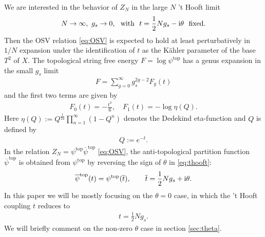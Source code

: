 \documentclass[11pt]{article}
\newcommand{\ri}{{\rm i}}
\def\th{\theta}
\newcommand{\hf}{\frac{1}{2}}
\def\b#1{\overline{#1}}
\renewcommand{\[}{\begin{eqnarray}}
\renewcommand{\]}{\end{eqnarray}}
\begin{document}
We are interested in the 
behavior of $Z_N$ in 
the large $N$ 't Hooft limit
\begin{align}
 N\to\infty,~g_s\to 0,~~ \text{with}~~ t=\hf Ng_s-\ri\th~~\text{fixed}.
\label{eq:thooft}
\end{align}
Then the OSV relation \eqref{eq:OSV}
is expected to hold  at least perturbatively in $1/N$ expansion 
under the identification of $t$ as the K\"{a}hler parameter of the base $T^2$
of $X$. The topological string
free energy $F=\log\psi^{\text{top}}$ has a genus expansion
in the small $g_s$ limit
\begin{align}
 F=\sum_{g=0}^\infty g_s^{2g-2}F_g(t)
\label{eq:free-g}
\end{align}
and the first two terms are given by
\begin{align}
 F_0(t)=-\frac{t^3}{6},\quad F_1(t)=-\log\eta(Q).
\label{eq:free-01}
\end{align}
Here $\eta(Q):=Q^{\frac{1}{24}}\prod_{n=1}^\infty (1-Q^n)$ denotes the Dedekind eta-function
and $Q$ is defined by
\begin{align}
 Q:=e^{-t}.
\end{align}
In the relation  $Z_N=\psi^{\text{top}}\b{\psi}^{\text{top}}$ \eqref{eq:OSV},
the anti-topological partition function $\b{\psi}^{\text{top}}$ is obtained from 
$\psi^{\text{top}}$ by reversing the sign of $\th$ in
\eqref{eq:thooft}: 
\begin{align}
 \b{\psi}^{\text{top}}(t)=\psi^{\text{top}}(\b{t}),\qquad
\b{t}=\hf Ng_s+\ri\th.
\end{align}
In this paper we will be mostly focusing on the $\th=0$ case,
in which the 't Hooft coupling $t$ reduces to
\begin{align}
 t=\hf  Ng_s.
\label{eq:thooft-t}
\end{align} 
We will briefly comment on the non-zero $\th$ case in section \ref{sec:theta}.
\end{document}

